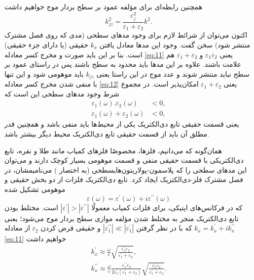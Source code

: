 همچنین رابطه‌ای برای مؤلفه عمود بر سطح بردار موج خواهیم داشت
\begin{equation}\label{eq:12}
k_{jz}^2=\frac{\varepsilon_j^2}{\varepsilon_1+\varepsilon_2}k^2.
\end{equation}
اکنون می‌توان از شرائط لازم برای وجود مدهای سطحی (مدی که روی فصل مشترک منتشر شود) سخن گفت. وجود این مدها معادل یافتن $k_x$ حقیقی (یا دارای جزء حقیقی) است. بنا بر این باید صورت و مخرج کسر معادله \ref{eq:11} یعنی $\varepsilon_1\varepsilon_2$ و $\varepsilon_1+\varepsilon_2$ هم علامت باشند. علاوه بر این مدها باید محدود به سطح باشند پس در راستای عمود بر سطح نباید منتشر شوند و عدد موج  در این راستا یعنی $k_{jz}$ باید موهومی شود و این تنها با منفی شدن مخرج کسر معادله \ref{eq:12} یعنی $\varepsilon_1+\varepsilon_2$ امکان‌پذیر است. در مجموع شرط وجود مدهای سطحی این است که
\begin{eqnarray}
\varepsilon_1(\omega).\varepsilon_2(\omega)&<0,\label{eq:13}\\
\varepsilon_1(\omega)+\varepsilon_2(\omega)&<0,\label{eq:14}
\end{eqnarray}
یعنی قسمت حقیقی تابع دی‌الکتریک یکی از محیط‌ها باید منفی باشد و همچنین قدر مطلق آن باید از قسمت حقیقی تابع دی‌الکتریک محیط دیگر بیشتر باشد.

همان‌گونه که می‌دانیم، فلزها، مخصوصًا فلزهای کمیاب مانند طلا و نقره، تابع دی‌الکتریکی با قسمت حقیقی منفی و قسمت موهومی بسیار کوچک دارند و می‌توان این مدهای سطحی را که پلاسمون-پولاریتون‌هایسطحی (به اختصار ) می‌نامیمشان، در فصل مشترک فلز-دی‌الکتریک ایجاد کرد.
تابع دی‌الکتریک فلزات از دو بخش حقیقی و موهومی تشکیل شده
\begin{equation}\label{eq_1}
\varepsilon(\omega)=\varepsilon ^\prime (\omega) +i\varepsilon ^{\prime\prime}(\omega)
\end{equation}
که در فرکانس‌های اپتیکی، برای فلزات کمیاب معمولًا $|\varepsilon ^\prime |>|\varepsilon ^{\prime\prime }|$ است.
مختلط بودن تابع دی‌الکتریک منجر به مختلط شدن مؤلفه موازی سطح بردار موج می‌شود؛ یعنی $k_x=k_x^\prime+ik_x^{\prime\prime}$ که با در نظر گرفتن $|\varepsilon_1^{\prime\prime}|\ll |\varepsilon_1^\prime|$ و حقیقی فرض کردن $\varepsilon_2$ از معادله \ref{eq:11} خواهیم داشت
\begin{eqnarray}
k_x^\prime\approx\frac{\omega}{c}\sqrt{\frac{\varepsilon_1^\prime\varepsilon_2}{\varepsilon_1^\prime+\varepsilon_2}},\label{eq:15}\\
k_x^{\prime\prime}\approx\frac{\omega}{c}\frac{\varepsilon_1^{\prime\prime}\varepsilon_2}{2\varepsilon_1^\prime(\varepsilon_1^\prime+\varepsilon_2)}\sqrt{\frac{\varepsilon_1^\prime\varepsilon_2}{\varepsilon_1^\prime+\varepsilon_2}}.\label{eq:16}
\end{eqnarray}

